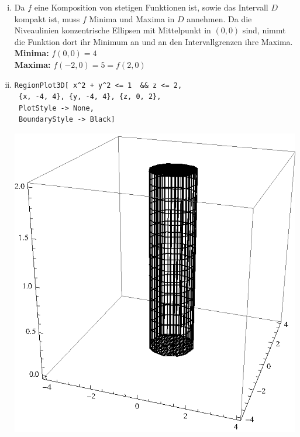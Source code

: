 \documentclass[10pt,a4paper]{scrartcl}
\begin{document}
\begin{enumerate}[(i)]
\begin{minipage}{0.50\columnwidth}
\begin{center}
\end{center}
\end{minipage}
\item 
Da $f$ eine Komposition von stetigen Funktionen ist, sowie das Intervall $D$ kompakt ist, muss $f$ Minima und Maxima in $D$ annehmen. Da die Niveaulinien konzentrische Ellipsen mit Mittelpunkt in $(0,0)$ sind, nimmt die Funktion dort ihr Minimum an und an den Intervallgrenzen ihre Maxima. %
\textbf{Minima: } $f(0,0) = 4$\\
\textbf{Maxima: } $f(-2,0) = 5 = f(2,0)$
\item 
\begin{minipage}{0.49\columnwidth}
\begin{lstlisting}[caption= Mathematica Code für den Graph von Z]
RegionPlot3D[ x^2 + y^2 <= 1  && z <= 2, 
 {x, -4, 4}, {y, -4, 4}, {z, 0, 2}, 
 PlotStyle -> None, 
 BoundaryStyle -> Black]
\end{lstlisting}
\end{minipage}
\begin{minipage}{0.50\columnwidth}
\begin{center}
\includegraphics[scale=0.7]{1iv3.eps} 

\end{center}
\end{minipage}
\end{enumerate}
\end{document}
